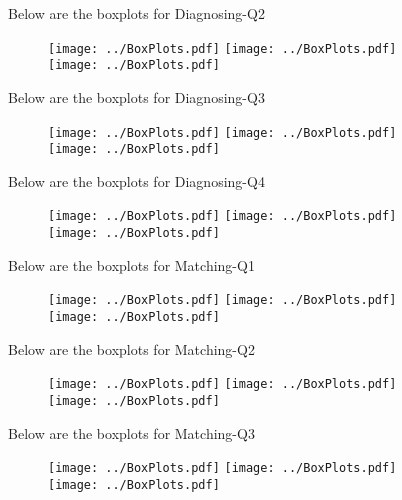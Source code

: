 \documentclass[11pt]{extarticle} %
\begin{document}
\newpage
Below are the boxplots for Diagnosing-Q2
\begin{figure}[H]
\centering 
\texttt{[image: ../BoxPlots.pdf]} 
\texttt{[image: ../BoxPlots.pdf]} \\
\texttt{[image: ../BoxPlots.pdf]} \\
\end{figure}

\newpage
Below are the boxplots for Diagnosing-Q3
\begin{figure}[H]
\centering 
\texttt{[image: ../BoxPlots.pdf]} 
\texttt{[image: ../BoxPlots.pdf]} \\
\texttt{[image: ../BoxPlots.pdf]} \\
\end{figure}

\newpage
Below are the boxplots for Diagnosing-Q4
\begin{figure}[H]
\centering 
\texttt{[image: ../BoxPlots.pdf]} 
\texttt{[image: ../BoxPlots.pdf]} \\
\texttt{[image: ../BoxPlots.pdf]} \\
\end{figure}

\newpage
Below are the boxplots for Matching-Q1
\begin{figure}[H]
\centering 
\texttt{[image: ../BoxPlots.pdf]} 
\texttt{[image: ../BoxPlots.pdf]} \\
\texttt{[image: ../BoxPlots.pdf]} \\
\end{figure}

\newpage
Below are the boxplots for Matching-Q2
\begin{figure}[H]
\centering 
\texttt{[image: ../BoxPlots.pdf]} 
\texttt{[image: ../BoxPlots.pdf]} \\
\texttt{[image: ../BoxPlots.pdf]} \\
\end{figure}

\newpage
Below are the boxplots for Matching-Q3
\begin{figure}[H]
\centering 
\texttt{[image: ../BoxPlots.pdf]} 
\texttt{[image: ../BoxPlots.pdf]} \\
\texttt{[image: ../BoxPlots.pdf]} \\
\end{figure}
\end{document}
